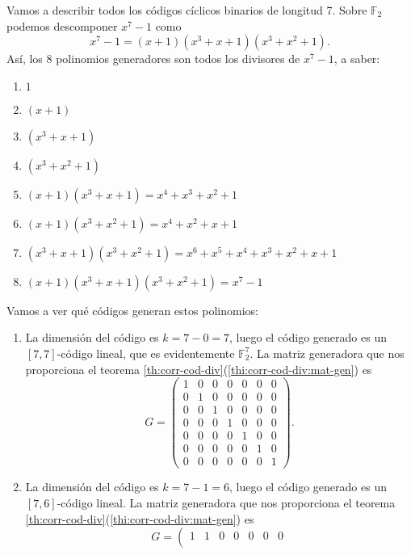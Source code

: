 \begin{example}
  Vamos a describir todos los códigos cíclicos binarios de longitud 7.
  Sobre \(\mathbb F_2\) podemos descomponer \(x^7 - 1\) como \[
    x^7 - 1 = (x + 1)(x^{3} + x + 1)(x^{3} + x^{2} + 1).
  \]
  Así, los 8 polinomios generadores son todos los divisores de \(x^7 - 1\), a saber: \begin{enumerate}
    \item \(1\)
    \item \((x + 1)\)
    \item \((x^{3} + x + 1)\)
    \item \((x^{3} + x^{2} + 1)\)
    \item \((x + 1)(x^{3} + x + 1) = x^4 + x^3 + x^2 + 1\)
    \item \((x + 1)(x^{3} + x^{2} + 1) = x^4 + x^2 + x + 1\)
    \item \((x^{3} + x + 1)(x^{3} + x^{2} + 1) = x^6 + x^5 + x^4 + x^3 + x^2 + x + 1\)
    \item \((x + 1)(x^{3} + x + 1)(x^{3} + x^{2} + 1) = x^7 - 1\)
  \end{enumerate}
  Vamos a ver qué códigos generan estos polinomios: \begin{enumerate}
    \item La dimensión del código es \(k = 7 - 0 = 7\), luego el código generado es un \([7, 7]\)-código lineal, que es evidentemente \(\mathbb F_2^7\). La matriz generadora que nos proporciona el teorema \ref{th:corr-cod-div}(\ref{thi:corr-cod-div:mat-gen}) es \[
      G = \left(\begin{array}{rrrrrrr}
        1 & 0 & 0 & 0 & 0 & 0 & 0 \\
        0 & 1 & 0 & 0 & 0 & 0 & 0 \\
        0 & 0 & 1 & 0 & 0 & 0 & 0 \\
        0 & 0 & 0 & 1 & 0 & 0 & 0 \\
        0 & 0 & 0 & 0 & 1 & 0 & 0 \\
        0 & 0 & 0 & 0 & 0 & 1 & 0 \\
        0 & 0 & 0 & 0 & 0 & 0 & 1
        \end{array}\right).
    \]
    \item La dimensión del código es \(k = 7 - 1 = 6\), luego el código generado es un \([7, 6]\)-código lineal.
    La matriz generadora que nos proporciona el teorema \ref{th:corr-cod-div}(\ref{thi:corr-cod-div:mat-gen}) es \[
      G = \left(\begin{array}{rrrrrrr}
        1 & 1 & 0 & 0 & 0 & 0 & 0 \\

\end{array}\]
\end{enumerate}
\end{example}
